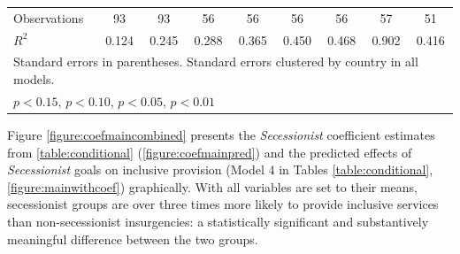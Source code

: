 \documentclass[12pt, letterpaper]{article}
\begin{document}
\begin{landscape}
\begin{table}[htbp]
\begin{small}
\begin{tabular}{l*{8}{c}}
\hline
Observations        &          93         &          93         &          56         &          56         &          56         &          56         &          57         &          51         \\
\(R^{2}\)           &       0.124         &       0.245         &       0.288         &       0.365         &       0.450         &       0.468         &       0.902         &       0.416         \\
\hline\hline
\multicolumn{9}{l}{\footnotesize Standard errors in parentheses. Standard errors clustered by country in all models.}\\
\multicolumn{9}{l}{\footnotesize \sym{+} \(p<0.15\), \sym{*} \(p<0.10\), \sym{**} \(p<0.05\), \sym{***} \(p<0.01\)}\\
\end{tabular}
\end{small}
\end{table}
\end{landscape}

Figure \ref{figure:coefmaincombined} presents the \textit{Secessionist} coefficient estimates from \autoref{table:conditional} (\autoref{figure:coefmainpred}) and the predicted effects of \textit{Secessionist} goals on inclusive provision (Model 4 in Tables \ref{table:conditional}, \autoref{figure:mainwithcoef}) graphically. With all variables are set to their means, secessionist groups are over three times more likely to provide inclusive services than non-secessionist insurgencies: a statistically significant and substantively meaningful difference between the two groups. 
\end{document}
